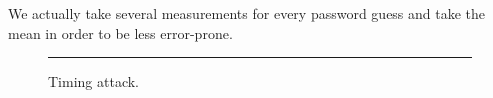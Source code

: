 We actually take several measurements for every password guess and take the mean in order to be less error-prone.

\newpage

\begin{figure}[h!]
    \begin{center}
        
        \caption{Timing attack.}
        \label{fig:as5-schematic}
        \vspace{1em}\hrule
    \end{center}
\end{figure}
